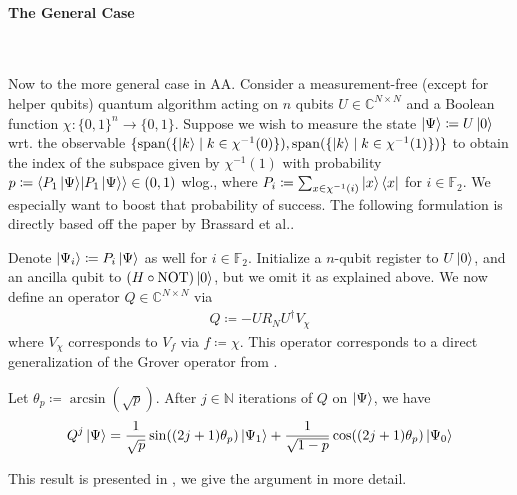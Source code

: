 \paragraph*{The General Case} \phantom{}\\\phantom{}

Now to the more general case in AA. Consider a measurement-free (except for helper qubits) quantum algorithm acting on \(n\) qubits \(U \in \mathbb{C}^{N \times N}\) and a Boolean function \(\chi\colon \{0, 1\}^n \to \{0, 1\}\). Suppose we wish to measure the state \(\ket{\Psi} \coloneqq U\ket{0}\) wrt. the observable \(\{\operatorname{span}(\{\ket{k} \mid k \in \chi^{-1}(0)\}), \operatorname{span}(\{\ket{k} \mid k \in \chi^{-1}(1)\})\}\) to obtain the index of the subspace given by \(\chi^{-1}(1)\) with probability \(p \coloneqq \braket{P_1\ket{\Psi}}{P_1\ket{\Psi}} \in (0, 1)\) wlog., where \(P_i \coloneqq \sum_{x \in \chi^{-1}(i)}\ket{x}\bra{x}\) for \(i \in \mathbb{F}_2\). We especially want to boost that probability of success. The following formulation is directly based off the paper by Brassard et al..

\phantom{}

Denote \(\ket{\Psi_i} \coloneqq P_i\ket{\Psi}\) as well for \(i \in \mathbb{F}_2\). Initialize a \(n\)-qubit register to \(U\ket{0}\), and an ancilla qubit to \((H \circ \operatorname{NOT})\ket{0}\), but we omit it as explained above. We now define an operator \(Q \in \mathbb{C}^{N \times N}\) via
\begin{align}
    Q \coloneqq -U R_N U^\dagger V_{\chi}
\end{align}
where \(V_{\chi}\) corresponds to \(V_f\) via \(f \coloneqq \chi\). This operator corresponds to a direct generalization of the Grover operator from .

\begin{lemma} \label{aa_iteration_lemma}
    Let \(\theta_p \coloneqq \arcsin(\sqrt{p})\). After \(j \in \mathbb{N}\) iterations of \(Q\) on \(\ket{\Psi}\), we have
    \begin{align}
        Q^j\ket{\Psi} = \frac{1}{\sqrt{p}}\sin((2j+1)\theta_p)\ket{\Psi_1}+\frac{1}{\sqrt{1-p}}\cos((2j+1)\theta_p)\ket{\Psi_0}
    \end{align}
\end{lemma}

This result is presented in \cite[pp. 5-7]{Brassard2000}, we give the argument in more detail.

